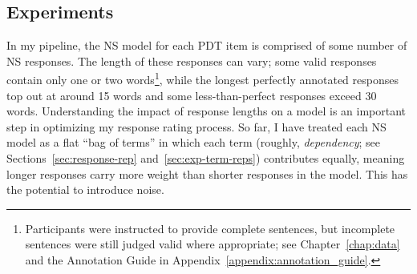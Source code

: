 \subsection{ Experiments}
\label{sec:exp-term-norm}

In my pipeline, the NS model for each PDT item is comprised of some number of NS responses.  The length of these responses can vary; some valid responses contain only one or two words\footnote{Participants were instructed to provide complete sentences, but incomplete sentences were still judged valid where appropriate; see Chapter~\ref{chap:data} and the Annotation Guide in Appendix~\ref{appendix:annotation_guide}.}, while the longest perfectly annotated responses top out at around 15 words and some less-than-perfect responses exceed 30 words. Understanding the impact of response lengths on a model is an important step in optimizing my response rating process. So far, I have treated each NS model as a flat ``bag of terms'' in which each term (roughly, \textit{dependency}; see Sections~\ref{sec:response-rep} and~\ref{sec:exp-term-reps}) contributes equally, meaning longer responses carry more weight than shorter responses in the model. This has the potential to introduce noise. 

